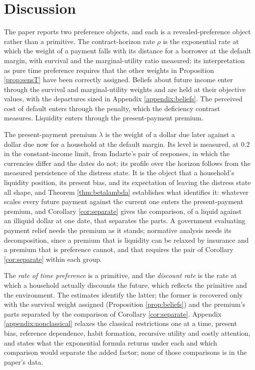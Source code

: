 \section{Discussion}\label{sec:discussion}

The paper reports two preference objects, and each is a revealed-preference object rather than a primitive. The contract-horizon rate $\rho$ is the exponential rate at which the weight of a payment falls with its distance for a borrower at the default margin, with survival and the marginal-utility ratio measured; its interpretation as pure time preference requires that the other weights in Proposition \ref{prop:sensT} have been correctly assigned. Beliefs about future income enter through the survival and marginal-utility weights and are held at their objective values, with the departures sized in Appendix \ref{appendix:beliefs}. The perceived cost of default enters through the penalty, which the deficiency contrast measures. Liquidity enters through the present-payment premium.

The present-payment premium $\lambda$ is the weight of a dollar due later against a dollar due now for a household at the default margin. Its level is measured, at $0.2$ in the constant-income limit, from Indarte's pair of responses, in which the currencies differ and the dates do not; its profile over the horizon follows from the measured persistence of the distress state. It is the object that a household's liquidity position, its present bias, and its expectation of leaving the distress state all shape, and Theorem \ref{thm:betalambda} establishes what identifies it: whatever scales every future payment against the current one enters the present-payment premium, and Corollary \ref{cor:separate} gives the comparison, of a liquid against an illiquid dollar at one date, that separates the parts. A government evaluating payment relief needs the premium as it stands; normative analysis needs its decomposition, since a premium that is liquidity can be relaxed by insurance and a premium that is preference cannot, and that requires the pair of Corollary \ref{cor:separate} within each group.

The \emph{rate of time preference} is a primitive, and the \emph{discount rate} is the rate at which a household actually discounts the future, which reflects the primitive and the environment. The estimates identify the latter; the former is recovered only with the survival weight assigned (Proposition \ref{prop:beliefs}) and the premium's parts separated by the comparison of Corollary \ref{cor:separate}. Appendix \ref{appendix:nonclassical} relaxes the classical restrictions one at a time, present bias, reference dependence, habit formation, recursive utility and costly attention, and states what the exponential formula returns under each and which comparison would separate the added factor; none of those comparisons is in the paper's data.
